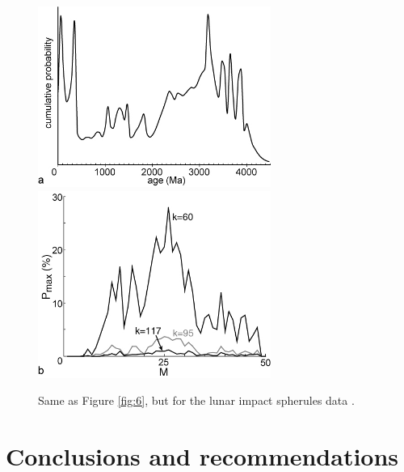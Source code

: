 \documentclass[12]{article}
\begin{document}
 \begin{figure}[here]
   \centering
   \includegraphics[width = 3in]{fig7a.jpg}
   \includegraphics[width = 3in]{fig7b.jpg}
   \caption{Same as Figure \ref{fig:6}, but for the lunar impact spherules data
   \cite{culler2000}.}
   \label{fig:7}
 \end{figure}

\section{Conclusions and recommendations}
\end{document}

